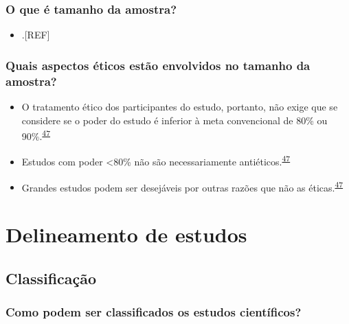 \documentclass[
]{book}
\providecommand{\tightlist}{%
  \setlength{\itemsep}{0pt}\setlength{\parskip}{0pt}}
\begin{document}
\hypertarget{o-que-uxe9-tamanho-da-amostra}{%
\subsection{O que é tamanho da amostra?}\label{o-que-uxe9-tamanho-da-amostra}}

\begin{itemize}
\tightlist
\item
  .{[}REF{]}
\end{itemize}

\hypertarget{quais-aspectos-uxe9ticos-estuxe3o-envolvidos-no-tamanho-da-amostra}{%
\subsection{Quais aspectos éticos estão envolvidos no tamanho da amostra?}\label{quais-aspectos-uxe9ticos-estuxe3o-envolvidos-no-tamanho-da-amostra}}

\begin{itemize}
\item
  O tratamento ético dos participantes do estudo, portanto, não exige que se considere se o poder do estudo é inferior à meta convencional de 80\% ou 90\%.\textsuperscript{\protect\hyperlink{ref-Bacchetti2005}{47}}
\item
  Estudos com poder \textless80\% não são necessariamente antiéticos.\textsuperscript{\protect\hyperlink{ref-Bacchetti2005}{47}}
\item
  Grandes estudos podem ser desejáveis por outras razões que não as éticas.\textsuperscript{\protect\hyperlink{ref-Bacchetti2005}{47}}
\end{itemize}

\hypertarget{delineamento-estudos}{%
\chapter{\texorpdfstring{\textbf{Delineamento de estudos}}{Delineamento de estudos}}\label{delineamento-estudos}}

\hypertarget{classificacao}{%
\section{Classificação}\label{classificacao}}

\hypertarget{como-podem-ser-classificados-os-estudos-cientuxedficos}{%
\subsection{Como podem ser classificados os estudos científicos?}\label{como-podem-ser-classificados-os-estudos-cientuxedficos}}
\end{document}
